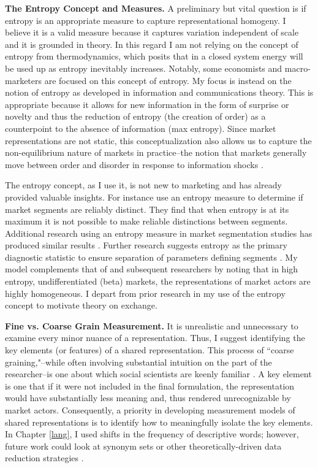 \textbf{The Entropy Concept and Measures.}
A preliminary but vital question is if entropy is an appropriate measure to capture representational homogeny. I believe it is a valid measure because it captures variation independent of scale and it is grounded in theory. In this regard I am not relying on the concept of entropy from thermodynamics, which posits that in a closed system energy will be used up as entropy inevitably increases. Notably, some economists \citep[see e.g.][]{georgescu1971, rifkin1980} and macro-marketers \citep{kilbourne1997} are focused on this concept of entropy. My focus is instead on the notion of entropy as developed in information and communications theory. This is appropriate because it allows for new information in the form of surprise or novelty and thus the reduction of entropy (the creation of order) as a counterpoint to the absence of information (max entropy). Since market representations are not static, this conceptualization also allows us to capture the non-equilibrium nature of markets in practice--the notion that markets generally move between order and disorder in response to information shocks \citep{hunt1999, dickson1992}. 

The entropy concept, as I use it, is not new to marketing and has already provided valuable insights. For instance \citet{ramaswamy1993} use an entropy measure to determine if market segments are reliably distinct. They find that when entropy is at its maximum it is not possible to make reliable distinctions between segments. Additional research using an entropy measure in market segmentation studies has produced similar results \citep{desarbo1995, kamakura1995, hofstede1999}. Further research suggests entropy as the primary diagnostic statistic to ensure separation of parameters defining segments \citep{kamakura1995}. My model complements that of \citet{ramaswamy1993} and subsequent researchers by noting that in high entropy, undifferentiated (beta) markets, the representations of market actors are highly homogeneous. I depart from prior research in my use of the entropy concept to motivate theory on exchange.

\textbf{Fine vs. Coarse Grain Measurement.}
It is unrealistic and unnecessary to examine every minor nuance of a representation. Thus, I suggest identifying the key elements (or features) of a shared representation. This process of ``coarse graining,"--while often involving substantial intuition on the part of the researcher--is one about which social scientists are keenly familiar \citep{klingenstein2014, stewart1981}. A key element is one that if it were not included in the final formulation, the representation would have substantially less meaning and, thus rendered unrecognizable by market actors. Consequently, a priority in developing measurement models of shared representations is to identify how to meaningfully isolate the key elements. In Chapter \ref{lang}, I used shifts in the frequency of descriptive words; however, future work could look at synonym sets or other theoretically-driven data reduction strategies \citep{klingenstein2014}.


